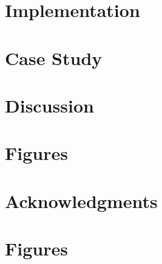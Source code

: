 \documentclass[utf8]{frontiersSCNS} %
\begin{document}
\section{Implementation}



\section{Case Study}

\section{Discussion}

\section{Figures}

\section*{Acknowledgments}





\section*{Figures}

\end{document}
